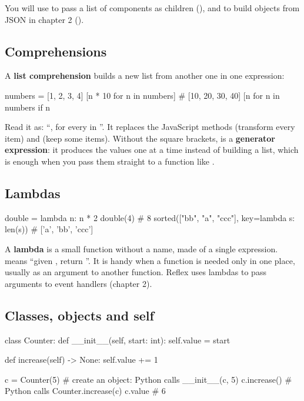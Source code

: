 You will use \cd{*} to pass a list of components as children (), and \cd{**} to build objects from JSON in chapter 2 ().

\subsection{Comprehensions}

A \textbf{list comprehension} builds a new list from another one in one expression:

\begin{py}
numbers = [1, 2, 3, 4]
[n * 10 for n in numbers]               # [10, 20, 30, 40]
[n for n in numbers if n %
\end{py}

Read it as: ``, for every  in ''. It replaces the JavaScript methods  (transform every item) and  (keep some items). Without the square brackets,  is a \textbf{generator expression}: it produces the values one at a time instead of building a list, which is enough when you pass them straight to a function like .

\subsection{Lambdas}

\begin{py}
double = lambda n: n * 2
double(4)                                 # 8
sorted(["bb", "a", "ccc"], key=lambda s: len(s))   # ['a', 'bb', 'ccc']
\end{py}

A \textbf{lambda} is a small function without a name, made of a single expression.  means ``given , return ''. It is handy when a function is needed only in one place, usually as an argument to another function. Reflex uses lambdas to pass arguments to event handlers (chapter 2).

\subsection{Classes, objects and self}

\begin{py}
class Counter:
	def __init__(self, start: int):
		self.value = start

	def increase(self) -> None:
		self.value += 1


c = Counter(5)       # create an object: Python calls __init__(c, 5)
c.increase()         # Python calls Counter.increase(c)
c.value              # 6
\end{py}

